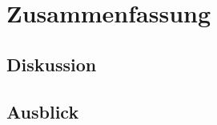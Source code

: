 \documentclass[%
english, ngerman,%
]{isw_smb_diss} %
\begin{document}
\chapter{Zusammenfassung}
\section{Diskussion}
\section{Ausblick}

\nocite{*}

\setlength{\emergencystretch}{.5em}
\printbibliography[heading=bibintoc]




\cleardoublepage
\listoffigures

\cleardoublepage
\listoftables


\end{document}
